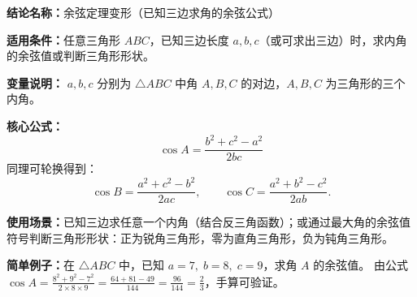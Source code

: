 \textbf{结论名称：}余弦定理变形（已知三边求角的余弦公式）

\textbf{适用条件：}任意三角形 \(ABC\)，已知三边长度 \(a,b,c\)（或可求出三边）时，求内角的余弦值或判断三角形形状。

\textbf{变量说明：} \(a,b,c\) 分别为 \(\triangle ABC\) 中角 \(A,B,C\) 的对边，\(A,B,C\) 为三角形的三个内角。

\textbf{核心公式：}
\[
\boxed{\cos A = \frac{b^{2}+c^{2}-a^{2}}{2bc}}
\]
同理可轮换得到：
\[
\cos B = \frac{a^{2}+c^{2}-b^{2}}{2ac}, \qquad 
\cos C = \frac{a^{2}+b^{2}-c^{2}}{2ab}.
\]

\textbf{使用场景：}已知三边求任意一个内角（结合反三角函数）；或通过最大角的余弦值符号判断三角形形状：正为锐角三角形，零为直角三角形，负为钝角三角形。

\textbf{简单例子：}在 \(\triangle ABC\) 中，已知 \(a=7,\; b=8,\; c=9\)，求角 \(A\) 的余弦值。
由公式 \(\displaystyle \cos A = \frac{8^{2}+9^{2}-7^{2}}{2\times8\times9} = \frac{64+81-49}{144} = \frac{96}{144} = \frac{2}{3}\)，手算可验证。